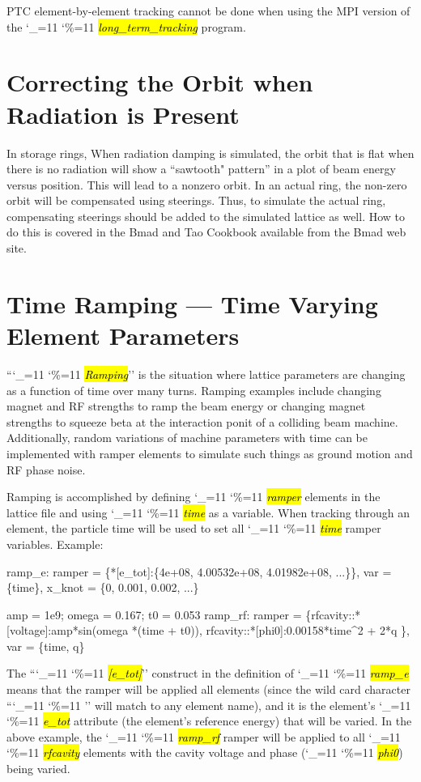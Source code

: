 \documentclass{hitec}
\newcommand\dottcmd[1]{\hl{\em#1}\endgroup}
\newcommand{\vn}{\begingroup\catcode`\_=11 \catcode`\%=11 \dottcmd}
\newcommand{\ltt}{\vn{long_term_tracking}\xspace}
\newcommand{\Section}[1]{\section{#1}\vspace*{-1ex}}
\begin{document}
{{{{{{{{{{{{PTC element-by-element tracking cannot be done when using the MPI version of the \ltt program.

\Section{Correcting the Orbit when Radiation is Present}

In storage rings, When radiation damping is simulated, the orbit that is flat when there is no
radiation will show a ``sawtooth" pattern'' in a plot of beam energy versus position. This will lead
to a nonzero orbit. In an actual ring, the non-zero orbit will be compensated using steerings. Thus,
to simulate the actual ring, compensating steerings should be added to the simulated lattice as
well. How to do this is covered in the Bmad and Tao Cookbook available from the Bmad web site.

\Section{Time Ramping --- Time Varying Element Parameters}
\label{s:ramp}

``\vn{Ramping}'' is the situation where lattice parameters are changing as a function of time over
many turns. Ramping examples include changing magnet and RF strengths to ramp the beam energy or
changing magnet strengths to squeeze beta at the interaction ponit of a colliding beam
machine. Additionally, random variations of machine parameters with time can be implemented with
ramper elements to simulate such things as ground motion and RF phase noise.

Ramping is accomplished by defining \vn{ramper} elements in the lattice file and using \vn{time} as
a variable. When tracking through an element, the particle time will be used to set all \vn{time}
ramper variables. Example:
\begin{code}
ramp_e: ramper = \{*[e_tot]:\{4e+08, 4.00532e+08, 4.01982e+08, ...\}\},
              var = \{time\}, x_knot = \{0, 0.001, 0.002, ...\}

amp = 1e9;  omega = 0.167;  t0 = 0.053
ramp_rf: ramper = \{rfcavity::*[voltage]:amp*sin(omega *(time + t0)),
      rfcavity::*[phi0]:0.00158*time^2 + 2*q \}, var = \{time, q\}
\end{code}
The ``\vn{*[e_tot]}'' construct in the definition of \vn{ramp_e} means that the ramper will be
applied all elements (since the wild card character ``\vn{*}'' will match to any element name), and
it is the element's \vn{e_tot} attribute (the element's reference energy) that will be varied.
In the above example, the \vn{ramp_rf} ramper will be applied to all \vn{rfcavity} elements with
the cavity voltage and phase (\vn{phi0}) being varied.

}}}}}}}}}}}}
\end{document}
